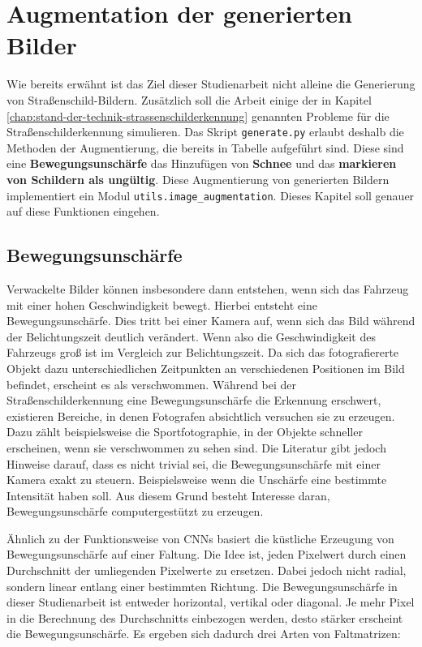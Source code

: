 \chapter{Augmentation der generierten Bilder}
\label{chap:5}

Wie bereits erwähnt ist das Ziel dieser Studienarbeit nicht alleine die Generierung von Straßenschild-Bildern. Zusätzlich soll die Arbeit einige der in Kapitel \ref{chap:stand-der-technik-strassenschilderkennung} genannten Probleme für die Straßenschilderkennung simulieren. Das Skript \texttt{generate.py} erlaubt deshalb die Methoden der Augmentierung, die bereits in Tabelle \label{tab:generate-cli} aufgeführt sind. Diese sind eine \textbf{Bewegungsunschärfe} das Hinzufügen von \textbf{Schnee} und das \textbf{markieren von Schildern als ungültig}. Diese Augmentierung von generierten Bildern implementiert ein Modul \lstinline[texcl=false]{utils.image_augmentation}. Dieses Kapitel soll genauer auf diese Funktionen eingehen.

\section{Bewegungsunschärfe}
Verwackelte Bilder können insbesondere dann entstehen, wenn sich das Fahrzeug mit einer hohen Geschwindigkeit bewegt. Hierbei entsteht eine Bewegungsunschärfe. Dies tritt bei einer Kamera auf, wenn sich das Bild während der Belichtungszeit deutlich verändert. Wenn also die Geschwindigkeit des Fahrzeugs groß ist im Vergleich zur Belichtungszeit. Da sich das fotografiererte Objekt dazu unterschiedlichen Zeitpunkten an verschiedenen Positionen im Bild befindet, erscheint es als verschwommen. Während bei der Straßenschilderkennung eine Bewegungsunschärfe die Erkennung erschwert, existieren Bereiche, in denen Fotografen absichtlich versuchen sie zu erzeugen. Dazu zählt beispielsweise die Sportfotographie, in der Objekte schneller erscheinen, wenn sie verschwommen zu sehen sind. Die Literatur gibt jedoch Hinweise darauf, dass es nicht trivial sei, die Bewegungsunschärfe mit einer Kamera exakt zu steuern. Beispielsweise wenn die Unschärfe eine bestimmte Intensität haben soll. Aus diesem Grund besteht Interesse daran, Bewegungsunschärfe computergestützt zu erzeugen. \cite{motion-blur}

Ähnlich zu der Funktionsweise von \acp{CNN} basiert die küstliche Erzeugung von Bewegungsunschärfe auf einer Faltung. Die Idee ist, jeden Pixelwert durch einen Durchschnitt der umliegenden Pixelwerte zu ersetzen. Dabei jedoch nicht radial, sondern linear entlang einer bestimmten Richtung. Die Bewegungsunschärfe in dieser Studienarbeit ist entweder horizontal, vertikal oder diagonal. Je mehr Pixel in die Berechnung des Durchschnitts einbezogen werden, desto stärker erscheint die Bewegungsunschärfe. Es ergeben sich dadurch drei Arten von Faltmatrizen: \cite{motion-blur}

